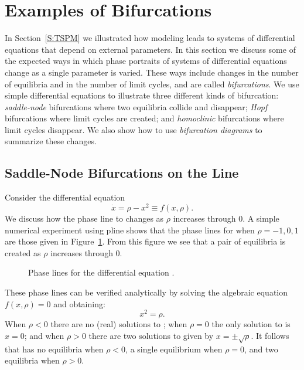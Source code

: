 \documentclass{ximera}
\begin{document}
\section{Examples of Bifurcations}
\label{S:bifurcation} 

In Section~\ref{S:TSPM} we illustrated how modeling leads to systems 
of differential equations that depend on external parameters.  In this 
section we discuss some of the expected ways in which phase portraits of 
systems of differential equations change as a single parameter is varied.  
These ways include changes in the number of equilibria and in the number 
of limit cycles, and are called {\em bifurcations\/}.   We use simple 
differential equations to illustrate three different kinds of bifurcation: 
{\em saddle-node\/} bifurcations where two equilibria collide and disappear; 
{\em Hopf\/} bifurcations where limit cycles are created; and 
{\em homoclinic\/} bifurcations where limit cycles disappear.  We also show 
how to use {\em bifurcation diagrams\/} to summarize these changes.

\subsection*{Saddle-Node Bifurcations on the Line}

Consider the differential equation
\begin{equation}  \label{E:sbif}
\dot{x} = \rho - x^2 \equiv f(x,\rho).
\end{equation}
We discuss how the phase line to  changes as $\rho$ increases 
through $0$.  A simple numerical experiment using {\sf pline} shows that
the phase lines for  when $\rho=-1,0,1$ are those given in 
Figure~\ref{F:sbif}.  From this figure we see that a pair of equilibria 
is created as $\rho$ increases through $0$.

\vspace{0.4in}

\begin{figure}[htb]
           \centerline{%
           }
           \caption{Phase lines for the differential equation 
    		\protect{}.}
           \label{F:sbif}
\end{figure}


These phase lines can be verified analytically by solving the 
algebraic equation $f(x,\rho)=0$ and obtaining:
\begin{equation} \label{E:sbife}
x^2 = \rho.
\end{equation}
When $\rho<0$ there are no (real) solutions to ; when
$\rho=0$ the only solution to  is $x=0$; and when $\rho>0$
there are two solutions to  given by $x=\pm\sqrt{\rho}$.
It follows that  has no equilibria when $\rho<0$, a single
equilibrium when $\rho=0$, and two equilibria when $\rho>0$.
\end{document}
